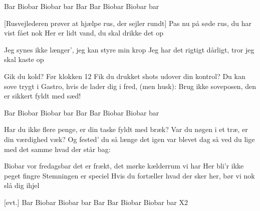 \documentclass[a4paper,11pt]{article}
\begin{document}
\begin{song}
   Bar Biobar Biobar bar
  Bar Bar Biobar Biobar bar
  
  [Rusvejlederen prøver at hjælpe rus, der sejler rundt]
  Pas nu på søde rus, du har vist fået nok
  Her er lidt vand, du skal drikke det op
  
   Jeg synes ikke længer', jeg kan styre min krop
  Jeg har det rigtigt dårligt, tror jeg skal kaste op
  
   Gik du kold?
    Før klokken 12
    Fik du drukket shots udover din kontrol?
    Du kan sove trygt i Gastro, hvis de lader dig i fred, (men husk):
    Brug ikke soveposen, den er sikkert fyldt med sæd!

   Bar Biobar Biobar bar
  Bar Bar Biobar Biobar bar

   Har du ikke flere penge, er din taske fyldt med bræk?
    Var du nøgen i et træ, er din værdighed væk?
    Og fested' du så længe det igen var blevet dag
    så ved du lige med det samme hvad der står bag:
    
   Biobar
    vor fredagsbar
    det er frækt, det mørke kælderrum vi har
    Her bli'r ikke peget fingre
    Stemningen er speciel
     Hvis du fortæller hvad der sker her, bør vi nok slå dig ihjel
    
    [evt.] Bar Biobar Biobar bar
    Bar Bar Biobar Biobar bar X2
\end{song}
\end{document}
